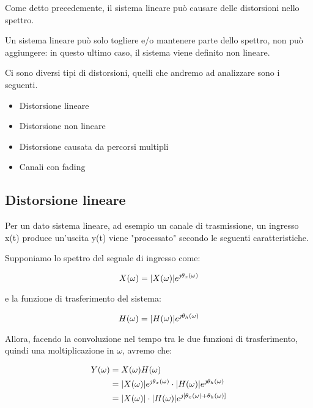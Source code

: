 Come detto precedemente, il sistema lineare può causare delle distorsioni nello spettro. \newline 

Un sistema lineare può solo togliere e/o mantenere parte dello spettro, non può aggiungere: 
in questo ultimo caso, il sistema viene definito non lineare. \newline 

Ci sono diversi tipi di distorsioni, quelli che andremo ad analizzare sono i seguenti. \newline 

\begin{itemize}
    \item Distorsione lineare 
    \item Distorsione non lineare 
    \item Distorsione causata da percorsi multipli 
    \item Canali con fading
\end{itemize} 

\newpage 

\subsection{Distorsione lineare} 

Per un dato sistema lineare, ad esempio un canale di trasmissione, un ingresso x(t) produce 
un'uscita y(t) viene "processato" secondo le seguenti caratteristiche. \newline 

Supponiamo lo spettro del segnale di ingresso come: 

{
    \Large 
    \begin{equation}
        X(\omega) = \abs{X(\omega)} e^{\jmath \theta_x (\omega)}
    \end{equation}
}

e la funzione di trasferimento del sistema: 

{
    \Large 
    \begin{equation}
        H(\omega) = \abs{H(\omega)} e^{\jmath \theta_h (\omega)}
    \end{equation}
}

Allora, facendo la convoluzione nel tempo tra le due funzioni di trasferimento, 
quindi una moltiplicazione in $\omega$, avremo che: 

{
    \Large 
    \begin{equation}
        \begin{split}
            Y(\omega) 
            &= 
            X(\omega) H(\omega) 
            \\ 
            &= \abs{X(\omega)} e^{\jmath \theta_x (\omega)} \cdot \abs{H(\omega)} e^{\jmath \theta_h (\omega)} 
            \\ 
            &= \abs{X(\omega)} \cdot \abs{H(\omega)} e^{\jmath [\theta_x (\omega) + \theta_h (\omega)]}
        \end{split}
    \end{equation}
}

